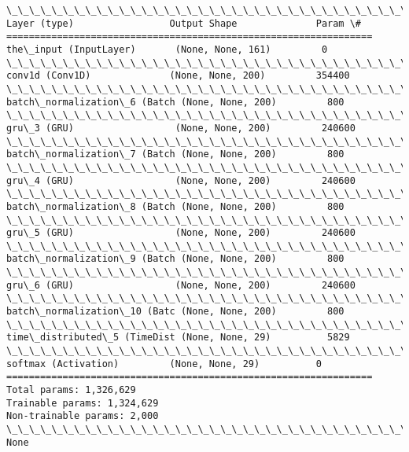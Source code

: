 \documentclass[11pt]{article}
\begin{document}
    \begin{Verbatim}[commandchars=\\\{\}]
\_\_\_\_\_\_\_\_\_\_\_\_\_\_\_\_\_\_\_\_\_\_\_\_\_\_\_\_\_\_\_\_\_\_\_\_\_\_\_\_\_\_\_\_\_\_\_\_\_\_\_\_\_\_\_\_\_\_\_\_\_\_\_\_\_
Layer (type)                 Output Shape              Param \#   
=================================================================
the\_input (InputLayer)       (None, None, 161)         0         
\_\_\_\_\_\_\_\_\_\_\_\_\_\_\_\_\_\_\_\_\_\_\_\_\_\_\_\_\_\_\_\_\_\_\_\_\_\_\_\_\_\_\_\_\_\_\_\_\_\_\_\_\_\_\_\_\_\_\_\_\_\_\_\_\_
conv1d (Conv1D)              (None, None, 200)         354400    
\_\_\_\_\_\_\_\_\_\_\_\_\_\_\_\_\_\_\_\_\_\_\_\_\_\_\_\_\_\_\_\_\_\_\_\_\_\_\_\_\_\_\_\_\_\_\_\_\_\_\_\_\_\_\_\_\_\_\_\_\_\_\_\_\_
batch\_normalization\_6 (Batch (None, None, 200)         800       
\_\_\_\_\_\_\_\_\_\_\_\_\_\_\_\_\_\_\_\_\_\_\_\_\_\_\_\_\_\_\_\_\_\_\_\_\_\_\_\_\_\_\_\_\_\_\_\_\_\_\_\_\_\_\_\_\_\_\_\_\_\_\_\_\_
gru\_3 (GRU)                  (None, None, 200)         240600    
\_\_\_\_\_\_\_\_\_\_\_\_\_\_\_\_\_\_\_\_\_\_\_\_\_\_\_\_\_\_\_\_\_\_\_\_\_\_\_\_\_\_\_\_\_\_\_\_\_\_\_\_\_\_\_\_\_\_\_\_\_\_\_\_\_
batch\_normalization\_7 (Batch (None, None, 200)         800       
\_\_\_\_\_\_\_\_\_\_\_\_\_\_\_\_\_\_\_\_\_\_\_\_\_\_\_\_\_\_\_\_\_\_\_\_\_\_\_\_\_\_\_\_\_\_\_\_\_\_\_\_\_\_\_\_\_\_\_\_\_\_\_\_\_
gru\_4 (GRU)                  (None, None, 200)         240600    
\_\_\_\_\_\_\_\_\_\_\_\_\_\_\_\_\_\_\_\_\_\_\_\_\_\_\_\_\_\_\_\_\_\_\_\_\_\_\_\_\_\_\_\_\_\_\_\_\_\_\_\_\_\_\_\_\_\_\_\_\_\_\_\_\_
batch\_normalization\_8 (Batch (None, None, 200)         800       
\_\_\_\_\_\_\_\_\_\_\_\_\_\_\_\_\_\_\_\_\_\_\_\_\_\_\_\_\_\_\_\_\_\_\_\_\_\_\_\_\_\_\_\_\_\_\_\_\_\_\_\_\_\_\_\_\_\_\_\_\_\_\_\_\_
gru\_5 (GRU)                  (None, None, 200)         240600    
\_\_\_\_\_\_\_\_\_\_\_\_\_\_\_\_\_\_\_\_\_\_\_\_\_\_\_\_\_\_\_\_\_\_\_\_\_\_\_\_\_\_\_\_\_\_\_\_\_\_\_\_\_\_\_\_\_\_\_\_\_\_\_\_\_
batch\_normalization\_9 (Batch (None, None, 200)         800       
\_\_\_\_\_\_\_\_\_\_\_\_\_\_\_\_\_\_\_\_\_\_\_\_\_\_\_\_\_\_\_\_\_\_\_\_\_\_\_\_\_\_\_\_\_\_\_\_\_\_\_\_\_\_\_\_\_\_\_\_\_\_\_\_\_
gru\_6 (GRU)                  (None, None, 200)         240600    
\_\_\_\_\_\_\_\_\_\_\_\_\_\_\_\_\_\_\_\_\_\_\_\_\_\_\_\_\_\_\_\_\_\_\_\_\_\_\_\_\_\_\_\_\_\_\_\_\_\_\_\_\_\_\_\_\_\_\_\_\_\_\_\_\_
batch\_normalization\_10 (Batc (None, None, 200)         800       
\_\_\_\_\_\_\_\_\_\_\_\_\_\_\_\_\_\_\_\_\_\_\_\_\_\_\_\_\_\_\_\_\_\_\_\_\_\_\_\_\_\_\_\_\_\_\_\_\_\_\_\_\_\_\_\_\_\_\_\_\_\_\_\_\_
time\_distributed\_5 (TimeDist (None, None, 29)          5829      
\_\_\_\_\_\_\_\_\_\_\_\_\_\_\_\_\_\_\_\_\_\_\_\_\_\_\_\_\_\_\_\_\_\_\_\_\_\_\_\_\_\_\_\_\_\_\_\_\_\_\_\_\_\_\_\_\_\_\_\_\_\_\_\_\_
softmax (Activation)         (None, None, 29)          0         
=================================================================
Total params: 1,326,629
Trainable params: 1,324,629
Non-trainable params: 2,000
\_\_\_\_\_\_\_\_\_\_\_\_\_\_\_\_\_\_\_\_\_\_\_\_\_\_\_\_\_\_\_\_\_\_\_\_\_\_\_\_\_\_\_\_\_\_\_\_\_\_\_\_\_\_\_\_\_\_\_\_\_\_\_\_\_
None

    \end{Verbatim}
\end{document}
